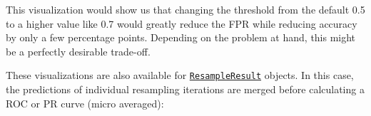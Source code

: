 This visualization would show us that changing the threshold from the
default 0.5 to a higher value like 0.7 would greatly reduce the FPR
while reducing accuracy by only a few percentage points. Depending on
the problem at hand, this might be a perfectly desirable trade-off.

These visualizations are also available for
\href{https://mlr3.mlr-org.com/reference/ResampleResult.html}{\texttt{ResampleResult}}
objects. In this case, the predictions of individual resampling
iterations are merged before calculating a ROC or PR curve (micro
averaged):

\begin{Shaded}
\begin{Highlighting}[]
\OtherTok{=} \NormalTok{(}
   \NormalTok{(}\NormalTok{),}
   \NormalTok{(}\NormalTok{, } \NormalTok{),}
   \NormalTok{(}\NormalTok{, } \NormalTok{)}
\NormalTok{)}
 \NormalTok{)}
 \NormalTok{)}
\end{Highlighting}
\end{Shaded}

